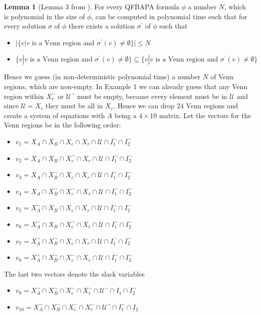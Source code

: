 \documentclass{book}
\theoremstyle{break}
\theoremstyle{definition}
\newtheorem{mylem}{Lemma}
\begin{document}
\begin{mylem}[Lemma 3 from \cite{4}]
For every QFBAPA formula $\phi$ a number $N$, which is polynomial in the size of $\phi$, can be computed in polynomial time such that for every solution $\sigma$ of $\phi$ there exists a solution $\sigma^\prime$ of $\phi$ such that
\begin{itemize}
\item $|\{v|v\text{ is a Venn region and }\sigma^\prime(v)\neq \emptyset\}|\leq N$
\item $\{v|v\text{ is a Venn region and }\sigma^\prime(v)\neq \emptyset\}\subseteq \{v|v\text{ is a Venn region and }\sigma^\prime(v)\neq \emptyset\}$
\end{itemize}
\end{mylem}
Hence we guess (in non-deterministic polynomial time) a number $N$ of Venn regions, which are non-empty. In Example 1 we can already guess that any Venn region within $X_r^\neg$ or $\mathcal{U}^\neg$ must be empty, because every element must be in $\mathcal{U}$ and since $\mathcal{U}=X_r$ they must be all in $X_r$. Hence we can drop $24$ Venn regions and create a system of equations with $A$ being a $4\times 10$ matrix. Let the vectors for the Venn regions be in the following order:
\begin{itemize}
\item $v_1=X_A\cap X_B\cap X_c\cap X_r\cap \mathcal{U}\cap I_1^\neg\cap I_2^\neg$
\item $v_2=X_A\cap X_B\cap X_c^\neg\cap X_r\cap \mathcal{U}\cap I_1^\neg\cap I_2^\neg$
\item $v_3=X_A\cap X_B^\neg\cap X_c\cap X_r\cap \mathcal{U}\cap I_1^\neg\cap I_2^\neg$
\item $v_4=X_A\cap X_B^\neg\cap X_c^\neg \cap X_r\cap \mathcal{U}\cap I_1^\neg\cap I_2^\neg$
\item $v_5=X_A^\neg\cap X_B\cap X_c\cap X_r\cap \mathcal{U}\cap I_1^\neg\cap I_2^\neg$
\item $v_6=X_A^\neg\cap X_B\cap X_c^\neg\cap X_r\cap \mathcal{U}\cap I_1^\neg\cap I_2^\neg$
\item $v_7=X_A^\neg\cap X_B^\neg\cap X_c\cap X_r\cap \mathcal{U}\cap I_1^\neg\cap I_2^\neg$
\item $v_8=X_A^\neg\cap X_B^\neg\cap X_c^\neg\cap X_r\cap \mathcal{U}\cap I_1^\neg\cap I_2^\neg$
\end{itemize}
The last two vectors denote the slack variables
\begin{itemize}
\item $v_9=X_A^\neg\cap X_B^\neg\cap X_c^\neg\cap X_r^\neg\cap \mathcal{U}^\neg\cap I_1\cap I_2^\neg$
\item $v_{10}=X_A^\neg\cap X_B^\neg\cap X_c^\neg\cap X_r^\neg\cap \mathcal{U}^\neg\cap I_1^\neg\cap I_2$
\end{itemize}
\end{document}
